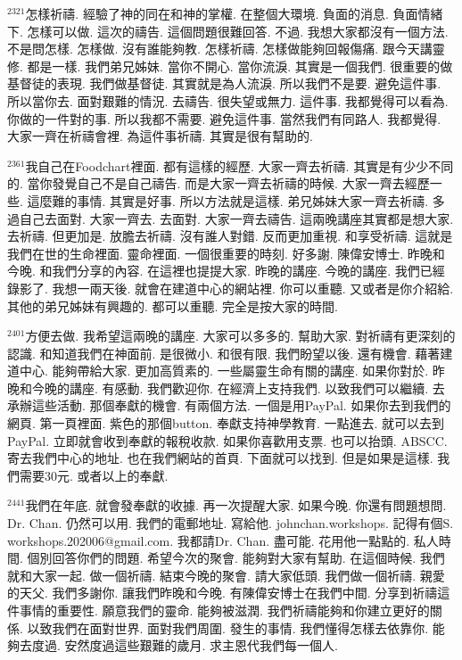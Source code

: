 \documentclass{book}
\begin{document}
$^{2321}$怎樣祈禱.
經驗了神的同在和神的掌權.
在整個大環境.
負面的消息.
負面情緒下.
怎樣可以做.
這次的禱告.
這個問題很難回答.
不過.
我想大家都沒有一個方法.
不是問怎樣.
怎樣做.
沒有誰能夠教.
怎樣祈禱.
怎樣做能夠回報傷痛.
跟今天講靈修.
都是一樣.
我們弟兄姊妹.
當你不開心.
當你流淚.
其實是一個我們.
很重要的做基督徒的表現.
我們做基督徒.
其實就是為人流淚.
所以我們不是要.
避免這件事.
所以當你去.
面對艱難的情況.
去禱告.
很失望或無力.
這件事.
我都覺得可以看為.
你做的一件對的事.
所以我都不需要.
避免這件事.
當然我們有同路人.
我都覺得.
大家一齊在祈禱會裡.
為這件事祈禱.
其實是很有幫助的.

$^{2361}$我自己在Foodchart裡面.
都有這樣的經歷.
大家一齊去祈禱.
其實是有少少不同的.
當你發覺自己不是自己禱告.
而是大家一齊去祈禱的時候.
大家一齊去經歷一些.
這麼難的事情.
其實是好事.
所以方法就是這樣.
弟兄姊妹大家一齊去祈禱.
多過自己去面對.
大家一齊去.
去面對.
大家一齊去禱告.
這兩晚講座其實都是想大家.
去祈禱.
但更加是.
放膽去祈禱.
沒有誰人對錯.
反而更加重視.
和享受祈禱.
這就是我們在世的生命裡面.
靈命裡面.
一個很重要的時刻.
好多謝.
陳偉安博士.
昨晚和今晚.
和我們分享的內容.
在這裡也提提大家.
昨晚的講座.
今晚的講座.
我們已經錄影了.
我想一兩天後.
就會在建道中心的網站裡.
你可以重聽.
又或者是你介紹給.
其他的弟兄姊妹有興趣的.
都可以重聽.
完全是按大家的時間.

$^{2401}$方便去做.
我希望這兩晚的講座.
大家可以多多的.
幫助大家.
對祈禱有更深刻的認識.
和知道我們在神面前.
是很微小.
和很有限.
我們盼望以後.
還有機會.
藉著建道中心.
能夠帶給大家.
更加高質素的.
一些屬靈生命有關的講座.
如果你對於.
昨晚和今晚的講座.
有感動.
我們歡迎你.
在經濟上支持我們.
以致我們可以繼續.
去承辦這些活動.
那個奉獻的機會.
有兩個方法.
一個是用PayPal.
如果你去到我們的網頁.
第一頁裡面.
紫色的那個button.
奉獻支持神學教育.
一點進去.
就可以去到PayPal.
立即就會收到奉獻的報稅收款.
如果你喜歡用支票.
也可以抬頭.
ABSCC.
寄去我們中心的地址.
也在我們網站的首頁.
下面就可以找到.
但是如果是這樣.
我們需要30元.
或者以上的奉獻.

$^{2441}$我們在年底.
就會發奉獻的收據.
再一次提醒大家.
如果今晚.
你還有問題想問.
Dr. Chan.
仍然可以用.
我們的電郵地址.
寫給他.
johnchan.workshops.
記得有個S.
workshops.202006@gmail.com.
我都請Dr. Chan.
盡可能.
花用他一點點的.
私人時間.
個別回答你們的問題.
希望今次的聚會.
能夠對大家有幫助.
在這個時候.
我們就和大家一起.
做一個祈禱.
結束今晚的聚會.
請大家低頭.
我們做一個祈禱.
親愛的天父.
我們多謝你.
讓我們昨晚和今晚.
有陳偉安博士在我們中間.
分享到祈禱這件事情的重要性.
願意我們的靈命.
能夠被滋潤.
我們祈禱能夠和你建立更好的關係.
以致我們在面對世界.
面對我們周圍.
發生的事情.
我們懂得怎樣去依靠你.
能夠去度過.
安然度過這些艱難的歲月.
求主恩代我們每一個人.
\end{document}
